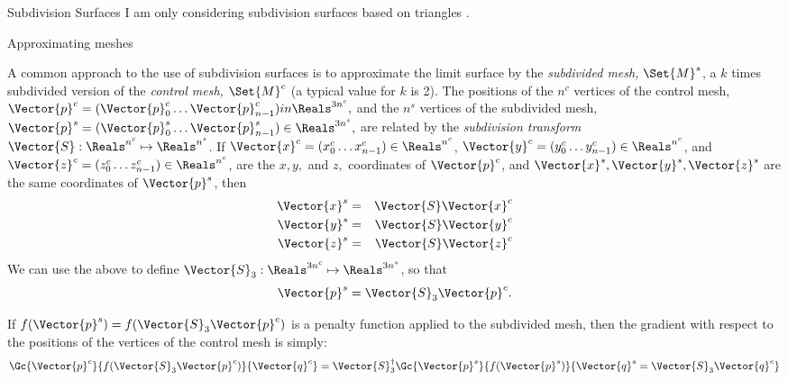 \begin{plSection}{Subdivision Surfaces}
I am only considering subdivision surfaces based on triangles
\cite{HoppeEtal:1994:SIGGRAPH,Hoppe:1994:Phd}.
\begin{plSection}{Approximating meshes}
\label{sec:Approximating-meshes}

A common approach to the use of subdivision surfaces is
to approximate the limit surface by the {\it subdivided mesh,} $\Set{M}^s$,
a $k$ times subdivided version of the {\it control mesh,} $\Set{M}^c$
(a typical value for $k$ is 2).
The positions of the $n^c$ vertices of the control mesh,
$\Vector{p}^c = (\Vector{p}^c_0 \ldots \Vector{p}^c_{n-1}) \\in \Reals^{3n^c},$
and the $n^s$ vertices of the subdivided mesh,
$\Vector{p}^s = (\Vector{p}^s_0 \ldots \Vector{p}^s_{n-1}) \in \Reals^{3n^s},$
are related by the {\it subdivision transform}
$\Vector{S} : \Reals^{n^c} \mapsto \Reals^{n^s}$.
If
$\Vector{x}^c = (x^c_0 \ldots x^c_{n-1}) \in \Reals^{n^c}$,
$\Vector{y}^c = (y^c_0 \ldots y^c_{n-1}) \in \Reals^{n^c}$,
and
$\Vector{z}^c = (z^c_0 \ldots z^c_{n-1}) \in \Reals^{n^c}$,
are the $x, y,$ and $z,$ coordinates of $\Vector{p}^c$,
and $\Vector{x}^s, \Vector{y}^s, \Vector{z}^s$ are the same coordinates
of $\Vector{p}^s$, then
\begin{eqnarray}
\Vector{x}^s & = & \Vector{S} \Vector{x}^c
\\
\Vector{y}^s & = & \Vector{S} \Vector{y}^c
\nonumber
\\
\Vector{z}^s & = & \Vector{S} \Vector{z}^c
\nonumber
\end{eqnarray}
We can use the above to define 
$\Vector{S}_3 : \Reals^{3n^c} \mapsto \Reals^{3n^s}$,
so that
\begin{equation}
\Vector{p}^s = \Vector{S}_3 \Vector{p}^c.
\end{equation}


If $f(\Vector{p}^s) = f(\Vector{S}_3 \Vector{p}^c)$ 
is a penalty function applied to the subdivided mesh,
then the gradient with respect to the positions of
the vertices of the control mesh is simply:
\begin{equation}
\Gc{\Vector{p}^c}{f(\Vector{S}_3 \Vector{p}^c)}{\Vector{q}^c}
 = \Vector{S}_3^{\dagger} 
    \Gc{\Vector{p}^s}{f(\Vector{p}^s)}{\Vector{q}^s 
 = \Vector{S}_3 \Vector{q}^c}
\end{equation}

\end{plSection}%
\end{plSection}%
